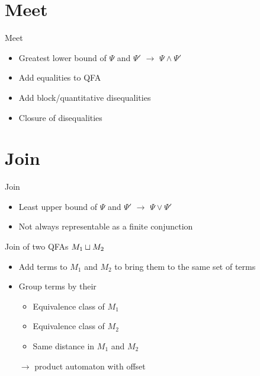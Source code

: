 \documentclass[aspectratio=169]{beamer}
\begin{document}
\section{Meet}
\begin{frame}{Meet}
    \begin{itemize}

        \item Greatest lower bound of $\Psi$ and $\Psi'$ $\rightarrow$ $\Psi \land \Psi'$
              \pause
        \item Add equalities to QFA
              \pause
        \item Add block/quantitative disequalities
              \pause
        \item Closure of disequalities
    \end{itemize}
\end{frame}


\section{Join}
\begin{frame}{Join}
    \begin{itemize}
        \item Least upper bound of $\Psi$ and $\Psi'$ $\rightarrow$ $\Psi \lor \Psi'$
              \pause
        \item Not always representable as a finite conjunction~\cite{join}

    \end{itemize}
\end{frame}

\begin{frame}{Join of two QFAs $M_1 \sqcup M_2$}
    \begin{itemize}
        \item Add terms to $M_1$ and $M_2$ to bring them to the same set of terms
        \pause
        \item Group terms by their
              \begin{itemize}
                  \item Equivalence class of $M_1$
                  \item Equivalence class of $M_2$
                  \item Same distance in $M_1$ and $M_2$
              \end{itemize}
              \pause
        \item[$\rightarrow$] product automaton with offset
    \end{itemize}
\end{frame}
\end{document}
